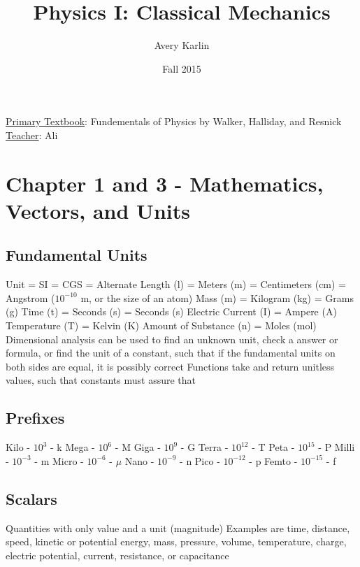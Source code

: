 \documentclass[11 pt, twoside]{article}
\newenvironment{outline*}
{
	\begin{outline}[enumerate]
	}
	{\end{outline}
}
\begin{document}
\title{Physics I: Classical Mechanics}
\author{Avery Karlin}
\date{Fall 2015}
\newcommand{\textbook}{Fundementals of Physics by Walker, Halliday, and Resnick}
\newcommand{\teacher}{Ali}

\maketitle
\newpage
\hypertarget{content}{\tableofcontents}
\vspace{11pt}
\noindent
\underline{Primary Textbook}: \textbook\\
\underline{Teacher}: \teacher
\newpage

\section{Chapter 1 and 3 - Mathematics, Vectors, and Units}
\subsection{Fundamental Units}
\begin{outline*}
\1 Unit = SI = CGS = Alternate
\1 Length (l) = Meters (m) = Centimeters (cm) = Angstrom ($10^{-10}$ m, or the size of an atom)
\1 Mass (m) = Kilogram (kg) = Grams (g)
\1 Time (t) = Seconds (s) = Seconds (s)
\1 Electric Current (I) = Ampere (A)
\1 Temperature (T) = Kelvin (K)
\1 Amount of Substance (n) = Moles (mol)
\1 Dimensional analysis can be used to find an unknown unit, check a answer or formula, or find the unit of a constant, such that if the fundamental units on both sides are equal, it is possibly correct
\2 Functions take and return unitless values, such that constants must assure that
\end{outline*}
\subsection{Prefixes}
\begin{outline*}
\1 Kilo - $10^3$ - k
\1 Mega - $10^6$ - M
\1 Giga - $10^9$ - G
\1 Terra - $10^{12}$ - T
\1 Peta - $10^{15}$ - P
\1 Milli - $10^{-3}$ - m
\1 Micro - $10^{-6}$ - $\mu$
\1 Nano - $10^{-9}$ - n
\1 Pico - $10^{-12}$ - p
\1 Femto - $10^{-15}$ - f
\end{outline*}
\subsection{Scalars}
\begin{outline*}
\1 Quantities with only value and a unit (magnitude)
\1 Examples are time, distance, speed, kinetic or potential energy, mass, pressure, volume, temperature, charge, electric potential, current, resistance, or capacitance
\end{outline*}
\end{document}
